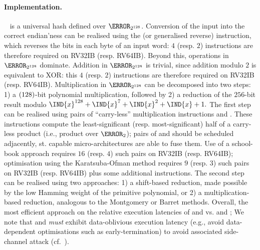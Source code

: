 
\paragraph{Implementation.}

~\cite[Section 6.4]{NIST:sp.800.38d} is a universal hash defined 
over $\F_{2^{128}}$.
Conversion of the input into the correct endian'ness can be realised using
the 
 (or generalised reverse)
instruction,
which reverses the bits in each byte of an input word:
$4$ (resp. $2$) 
instructions are therefore required on RV32IB (resp. RV64IB).
Beyond this, operations in $\F_{2^{128}}$ dominate.
Addition       in $\F_{2^{128}}$ 
is trivial, since addition modulo $2$ is equivalent to XOR: this
$4$ (resp. $2$) 
instructions are therefore required on RV32IB (resp. RV64IB).
Multiplication in $\F_{2^{128}}$ 
can be decomposed into two steps:
1) a $( 128 \time 128 )$-bit polynomial multiplication, 
   followed by 
2) a reduction of the $256$-bit result modulo
   $
   \IND{x}^{128} + \IND{x}^{7} + \IND{x}^{2} + \IND{x} + 1 .
   $
The first  step 
can be realised using pairs of ``carry-less'' multiplication instructions
 and .
These instructions compute the least-significant (resp. most-significant) 
half of a carry-less product (i.e., product over $\F_2$); pairs of 
 and 
should be scheduled adjacently, st. capable micro-architectures are able 
to fuse them.
Use of a school-book approach 
requires
$16$ (resp. $4$) such pairs 
on RV32IB (resp. RV64IB);
optimisation using the Karatsuba-Ofman method
requires
$ 9$ (resp. $3$) such pairs 
on RV32IB (resp. RV64IB) 
plus some additional  instructions.
The second step
can be realised using two approaches:
1) a          shift-based reduction, made possible by the low Hamming weight of the primitive polynomial,
   or
2) a multiplication-based reduction, analogous to the Montgomery or Barret methods.
Overall, the most efficient approach on the relative execution latencies of
 and 
vs.
 and ;
We note that 
 and 
{\em must} exhibit data-oblivious execution latency 
(e.g., avoid data-dependent optimisations such as early-termination)
to avoid associated side-channel attack (cf.~\cite{GOPT:09}).


